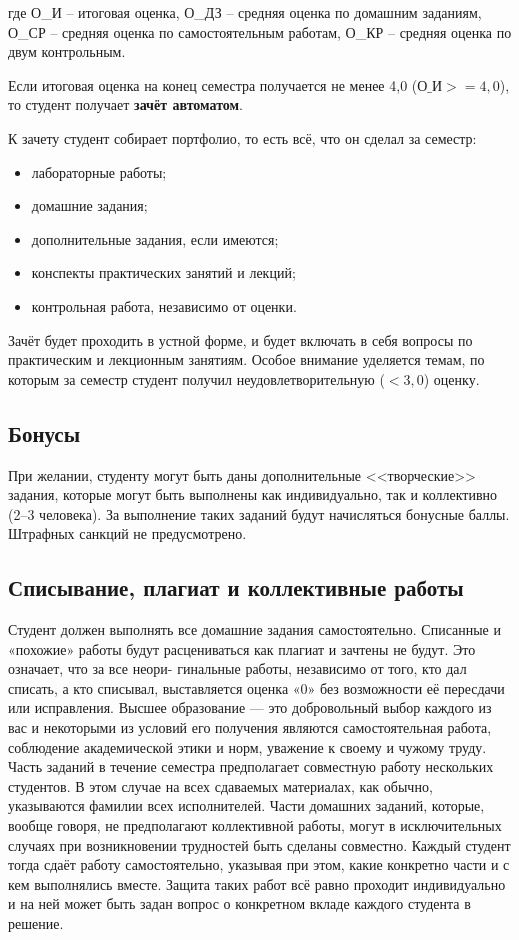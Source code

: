 \documentclass[11pt, a4paper]{article}
\theoremstyle{plain}
\theoremstyle{definition}
\theoremstyle{remark}
\begin{document}
где О\_И – итоговая оценка, О\_ДЗ – средняя оценка по домашним заданиям, О\_СР – средняя оценка по
самостоятельным работам, О\_КР – средняя оценка по двум контрольным.

Если итоговая оценка на конец семестра получается не менее 4,0 ($\text{О\_И} >= 4,0$), то студент получает
\textbf{зачёт автоматом}. 

К зачету студент собирает портфолио, то есть всё, что он сделал за семестр:
\begin{itemize}
    \item лабораторные работы;
    \item домашние задания;
    \item дополнительные задания, если имеются;
    \item конспекты практических занятий и лекций;
    \item контрольная работа, независимо от оценки.
\end{itemize}

Зачёт будет проходить в устной форме, и будет включать в себя вопросы по практическим и лекционным занятиям.
Особое внимание уделяется темам, по которым за семестр студент получил неудовлетворительную ($<3,0$)
оценку.

\subsection{Бонусы}

При желании, студенту могут быть даны дополнительные <<творческие>> задания, которые могут быть
выполнены как индивидуально, так и коллективно (2--3 человека). За выполнение таких заданий будут
начисляться бонусные баллы. Штрафных санкций не предусмотрено.

\subsection{Списывание, плагиат и коллективные работы}
Студент должен выполнять все домашние задания самостоятельно. Списанные и «похожие»
работы будут расцениваться как плагиат и зачтены не будут. Это означает, что за все неори-
гинальные работы, независимо от того, кто дал списать, а кто списывал, выставляется оценка
«0» без возможности её пересдачи или исправления. Высшее образование — это добровольный
выбор каждого из вас и некоторыми из условий его получения являются самостоятельная работа,
соблюдение академической этики и норм, уважение к своему и чужому труду.
Часть заданий в течение семестра предполагает совместную работу нескольких студентов. В
этом случае на всех сдаваемых материалах, как обычно, указываются фамилии всех исполнителей.
Части домашних заданий, которые, вообще говоря, не предполагают коллективной работы, могут
в исключительных случаях при возникновении трудностей быть сделаны совместно. Каждый
студент тогда сдаёт работу самостоятельно, указывая при этом, какие конкретно части и с кем
выполнялись вместе. Защита таких работ всё равно проходит индивидуально и на ней может быть
задан вопрос о конкретном вкладе каждого студента в решение.
\end{document}
